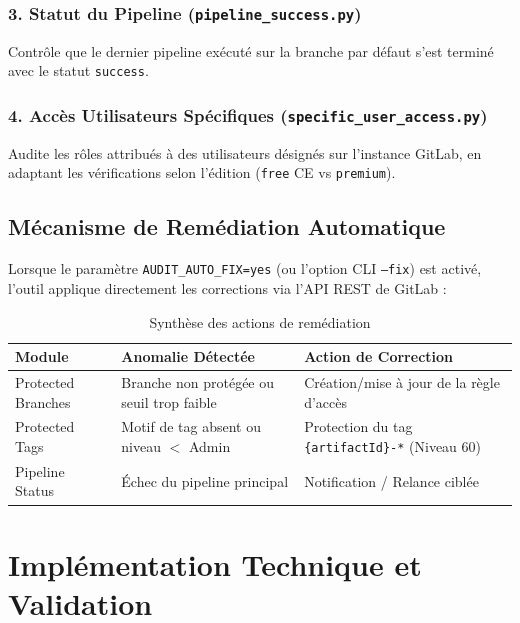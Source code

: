 \documentclass[12pt,a4paper]{report}
\begin{document}
\subsection{3. Statut du Pipeline (\texttt{pipeline\_success.py})}
Contrôle que le dernier pipeline exécuté sur la branche par défaut s'est terminé avec le statut \texttt{success}.

\subsection{4. Accès Utilisateurs Spécifiques (\texttt{specific_user_access.py})}
Audite les rôles attribués à des utilisateurs désignés sur l'instance GitLab, en adaptant les vérifications selon l'édition (\texttt{free} CE vs \texttt{premium}).

\section{Mécanisme de Remédiation Automatique}
Lorsque le paramètre \texttt{AUDIT\_AUTO\_FIX=yes} (ou l'option CLI \texttt{--fix}) est activé, l'outil applique directement les corrections via l'API REST de GitLab :

\begin{table}[htbp]
    \centering
    \caption{Synthèse des actions de remédiation}
    \begin{tabular}{lll}
        \toprule
        \textbf{Module} & \textbf{Anomalie Détectée} & \textbf{Action de Correction} \\
        \midrule
        Protected Branches & Branche non protégée ou seuil trop faible & Création/mise à jour de la règle d'accès \\
        Protected Tags & Motif de tag absent ou niveau $<$ Admin & Protection du tag \texttt{\{artifactId\}-*} (Niveau 60) \\
        Pipeline Status & Échec du pipeline principal & Notification / Relance ciblée \\
        \bottomrule
    \end{tabular}
\end{table}

\chapter{Implémentation Technique et Validation}
\end{document}
